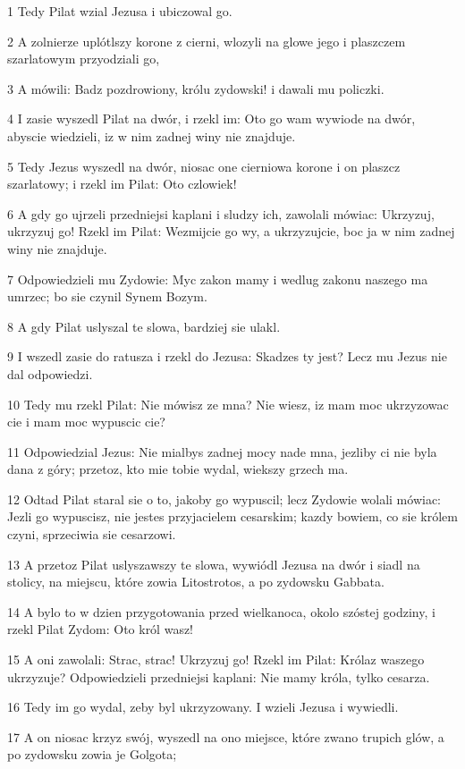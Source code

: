 \par 1 Tedy Pilat wzial Jezusa i ubiczowal go.
\par 2 A zolnierze uplótlszy korone z cierni, wlozyli na glowe jego i plaszczem szarlatowym przyodziali go,
\par 3 A mówili: Badz pozdrowiony, królu zydowski! i dawali mu policzki.
\par 4 I zasie wyszedl Pilat na dwór, i rzekl im: Oto go wam wywiode na dwór, abyscie wiedzieli, iz w nim zadnej winy nie znajduje.
\par 5 Tedy Jezus wyszedl na dwór, niosac one cierniowa korone i on plaszcz szarlatowy; i rzekl im Pilat: Oto czlowiek!
\par 6 A gdy go ujrzeli przedniejsi kaplani i sludzy ich, zawolali mówiac: Ukrzyzuj, ukrzyzuj go! Rzekl im Pilat: Wezmijcie go wy, a ukrzyzujcie, boc ja w nim zadnej winy nie znajduje.
\par 7 Odpowiedzieli mu Zydowie: Myc zakon mamy i wedlug zakonu naszego ma umrzec; bo sie czynil Synem Bozym.
\par 8 A gdy Pilat uslyszal te slowa, bardziej sie ulakl.
\par 9 I wszedl zasie do ratusza i rzekl do Jezusa: Skadzes ty jest? Lecz mu Jezus nie dal odpowiedzi.
\par 10 Tedy mu rzekl Pilat: Nie mówisz ze mna? Nie wiesz, iz mam moc ukrzyzowac cie i mam moc wypuscic cie?
\par 11 Odpowiedzial Jezus: Nie mialbys zadnej mocy nade mna, jezliby ci nie byla dana z góry; przetoz, kto mie tobie wydal, wiekszy grzech ma.
\par 12 Odtad Pilat staral sie o to, jakoby go wypuscil; lecz Zydowie wolali mówiac: Jezli go wypuscisz, nie jestes przyjacielem cesarskim; kazdy bowiem, co sie królem czyni, sprzeciwia sie cesarzowi.
\par 13 A przetoz Pilat uslyszawszy te slowa, wywiódl Jezusa na dwór i siadl na stolicy, na miejscu, które zowia Litostrotos, a po zydowsku Gabbata.
\par 14 A bylo to w dzien przygotowania przed wielkanoca, okolo szóstej godziny, i rzekl Pilat Zydom: Oto król wasz!
\par 15 A oni zawolali: Strac, strac! Ukrzyzuj go! Rzekl im Pilat: Królaz waszego ukrzyzuje? Odpowiedzieli przedniejsi kaplani: Nie mamy króla, tylko cesarza.
\par 16 Tedy im go wydal, zeby byl ukrzyzowany. I wzieli Jezusa i wywiedli.
\par 17 A on niosac krzyz swój, wyszedl na ono miejsce, które zwano trupich glów, a po zydowsku zowia je Golgota;
